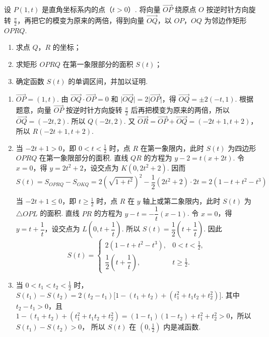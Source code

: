 \begin{problem}
设 \(P(1, t)\) 是直角坐标系内的点（\(t > 0\)）. 将向量 \(\overrightarrow{OP}\) 绕原点 \(O\) 按逆时针方向旋转 \(\frac{\pi}{2}\)，再把它的模变为原来的两倍，得到向量 \(\overrightarrow{OQ}\)，以 \(OP\)，\(OQ\) 为邻边作矩形 \(OPRQ\).
\begin{enumerate}
\item 求点 \(Q\)，\(R\) 的坐标；
\item 求矩形 \(OPRQ\) 在第一象限部分的面积 \(S(t)\)；
\item 确定函数 \(S(t)\) 的单调区间，并加以证明.
\end{enumerate}
\end{problem}

\begin{solution}
\begin{enumerate}
\item \(\overrightarrow{OP} = (1,t)\). 由 \(\overrightarrow{OQ}\cdot\overrightarrow{OP}=0\) 和 \(\lvert\overrightarrow{OQ}\rvert=2\lvert\overrightarrow{OP}\rvert\)，得 \(\overrightarrow{OQ}=\pm 2(-t,1)\). 根据题意，向量 \(\overrightarrow{OP}\) 按逆时针方向旋转 \(\frac{\pi}{2}\) 后再把模变为原来的两倍，所以 \(\overrightarrow{OQ}=(-2t,2)\).
所以 \(Q(-2t,2)\). 又 \(\overrightarrow{OR} = \overrightarrow{OP} + \overrightarrow{OQ} = (-2t+1, t+2)\)，所以 \(R(-2t+1,t+2)\).

\item 当 \(-2t+1>0\)，即 \(0<t<\frac12\) 时，点 \(R\) 在第一象限内，此时 \(S(t)\) 为四边形 \(OPRQ\) 在第一象限部分的面积.
直线 \(QR\) 的方程为 \(y-2=t(x+2t)\). 令 \(x=0\)，得 \(y=2t^2+2\)，设交点为 \(K(0,2t^2+2)\). 因而
\[
S(t)=S_{OPRQ}-S_{OKQ}=2\left(\sqrt{1+t^2}\right)^2-\frac12(2t^2+2)\cdot 2t=2(1-t+t^2-t^3)
\]

当 \(-2t+1\le0\)，即 \(t\ge\frac12\) 时，点 \(R\) 在 \(y\) 轴上或第二象限内，此时 \(S(t)\) 为 \(\triangle OPL\) 的面积.
直线 \(PR\) 的方程为 \(y-t=-\dfrac{1}{t}(x-1)\).
令 \(x=0\)，得 \(y=t+\dfrac1t\)，设交点为 \(L\!\left(0,t+\dfrac1t\right)\). 所以 \(S(t)=\dfrac12\left(t+\dfrac1t\right)\).
因此
\[
S(t)=
\begin{cases}
2(1-t+t^2-t^3), & 0<t<\frac12,\\
\dfrac12\left(t+\dfrac1t\right), & t\ge\frac12.
\end{cases}
\]

\item 当 \(0<t_1<t_2<\frac12\) 时，
\(S(t_1)-S(t_2)=2(t_2-t_1)\bigl[1-(t_1+t_2)+(t_1^2+t_1t_2+t_2^2)\bigr]\). 其中 \(t_2-t_1>0\)，且
\(1-(t_1+t_2)+(t_1^2+t_1t_2+t_2^2)=(1-t_1)(1-t_2)+t_1^2+t_2^2>0\)，所以 \(S(t_1)-S(t_2)>0\)，
所以 \(S(t)\) 在 \((0,\frac12)\) 内是减函数.


\end{enumerate}
\end{solution}
